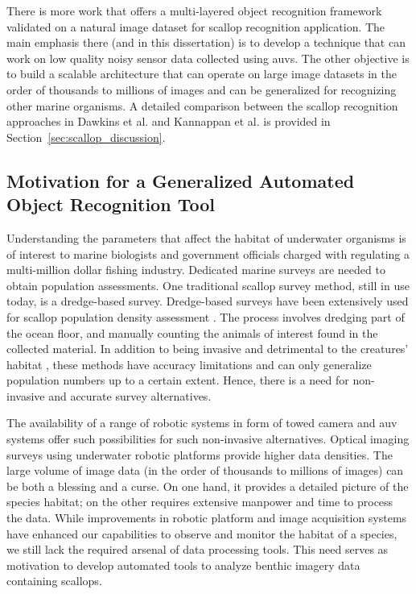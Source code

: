 \documentclass {udthesis}
\begin{document}
There is more work \cite{prasanna_med, prasanna_aslo, prasanna_igi} that offers a multi-layered object recognition framework validated on
a natural image dataset for scallop recognition application. 
The main emphasis there (and in this dissertation) is to develop a technique that can work on low quality noisy sensor data collected using \gls{auv}s.
The other objective is to build a scalable architecture that can operate on 
large image datasets in the order of thousands to millions of images
and can be generalized for recognizing other marine organisms.
A detailed comparison between the scallop recognition approaches in Dawkins et al. \cite{dawkings13} and Kannappan et al.\cite{prasanna_igi} is provided in Section~\ref{sec:scallop_discussion}.


\subsection{Motivation for a Generalized Automated Object Recognition Tool}

Understanding the parameters that affect the habitat of underwater organisms is of interest to marine
biologists and government officials charged with regulating a multi-million dollar fishing industry. Dedicated
marine surveys are needed to obtain population assessments. One traditional scallop survey method, still
in use today,  is a dredge-based survey. Dredge-based surveys have been extensively used for scallop population density
assessment \cite{nefsc}. The process involves dredging part of the ocean floor, and manually counting the
animals of interest found in the collected material. In addition to being invasive and
detrimental to the creatures’ habitat \cite{jenkins}, these methods have accuracy
limitations and can only generalize population numbers up to a certain extent.
Hence, there is a need for non-invasive and accurate survey alternatives.

The availability of a range of robotic systems in form of towed camera and \gls{auv} systems offer such 
possibilities for such non-invasive alternatives. Optical imaging surveys using underwater
robotic platforms provide higher data densities. The large volume of image data (in the order of thousands
to millions of images) can be both a blessing and a curse. On one hand, it provides a detailed picture of
the species habitat; on the other requires extensive manpower and time to process the data.
While improvements in robotic platform and image acquisition systems have enhanced our capabilities to
observe and monitor the habitat of a species, we still lack the required arsenal of data processing tools. This
need serves as motivation to develop automated tools to analyze benthic imagery data containing scallops.
\end{document}
